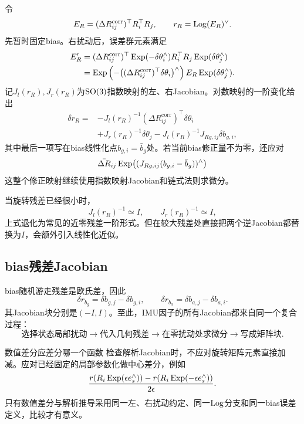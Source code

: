 令
\[
    E_R=(\Delta R_{ij}^{\mathrm{corr}})^\top R_i^\top R_j,
    \qquad
    r_R=\operatorname{Log}(E_R)^\vee.
\]
先暂时固定bias。右扰动后，误差群元素满足
\[
\begin{aligned}
    E_R'
    &=(\Delta R_{ij}^{\mathrm{corr}})^\top
      \operatorname{Exp}(-\delta\theta_i^\wedge)
      R_i^\top R_j
      \operatorname{Exp}(\delta\theta_j^\wedge)\\
    &=\operatorname{Exp}\left(
        -\bigl((\Delta R_{ij}^{\mathrm{corr}})^\top
          \delta\theta_i\bigr)^\wedge
      \right)
      E_R
      \operatorname{Exp}(\delta\theta_j^\wedge).
\end{aligned}
\]
记$J_l(r_R),J_r(r_R)$为$\operatorname{SO}(3)$指数映射的左、右Jacobian。对数映射的一阶变化给出
\[
\boxed{
\begin{aligned}
    \delta r_R
    ={}&-J_l(r_R)^{-1}
       (\Delta R_{ij}^{\mathrm{corr}})^\top
       \delta\theta_i\\
      &+J_r(r_R)^{-1}\delta\theta_j
      -J_l(r_R)^{-1}J_{R g,ij}\delta b_{g,i},
\end{aligned}
}
\]
其中最后一项写在bias线性化点$b_{g,i}=\bar b_g$处。若当前bias修正量不为零，还应对
\[
    \bar{\Delta R}_{ij}
    \operatorname{Exp}\bigl((J_{R g,ij}(b_{g,i}-\bar b_g))^\wedge\bigr)
\]
这整个修正映射继续使用指数映射Jacobian和链式法则求微分。

当旋转残差已经很小时，
\[
    J_l(r_R)^{-1}\simeq I,
    \qquad
    J_r(r_R)^{-1}\simeq I,
\]
上式退化为常见的近零残差一阶形式。但在较大残差处直接把两个逆Jacobian都替换为$I$，会额外引入线性化近似。

\subsection{bias残差Jacobian}

bias随机游走残差是欧氏差，因此
\[
    \delta r_{b_g}=\delta b_{g,j}-\delta b_{g,i},
    \qquad
    \delta r_{b_a}=\delta b_{a,j}-\delta b_{a,i}.
\]
其Jacobian块分别是$(-I,I)$。至此，IMU因子的所有Jacobian都来自同一个复合过程：
\[
\boxed{
\text{选择状态局部扰动}
\longrightarrow
\text{代入几何残差}
\longrightarrow
\text{在零扰动处求微分}
\longrightarrow
\text{写成矩阵块}.
}
\]

\begin{imucase}{数值差分应差分哪一个函数}
检查解析Jacobian时，不应对旋转矩阵元素直接加减。应对已经固定的局部参数化做中心差分，例如
\[
    \frac{
      r(R_i\operatorname{Exp}(\epsilon e_s^\wedge))-r(R_i\operatorname{Exp}(-\epsilon e_s^\wedge))
    }{2\epsilon}.
\]
只有数值差分与解析推导采用同一左、右扰动约定、同一$\operatorname{Log}$分支和同一bias误差定义，比较才有意义。
\end{imucase}

